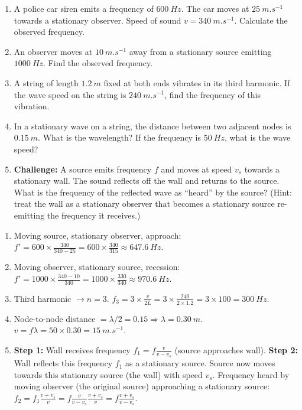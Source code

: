 \documentclass[11pt]{article}
\begin{document}
\begin{exercice}
\begin{enumerate}
\item A police car siren emits a frequency of $\SI{600}{Hz}$. The car moves at $\SI{25}{m.s^{-1}}$ towards a stationary observer. Speed of sound $v = \SI{340}{m.s^{-1}}$. Calculate the observed frequency.
\item An observer moves at $\SI{10}{m.s^{-1}}$ away from a stationary source emitting $\SI{1000}{Hz}$. Find the observed frequency.
\item A string of length $\SI{1.2}{m}$ fixed at both ends vibrates in its third harmonic. If the wave speed on the string is $\SI{240}{m.s^{-1}}$, find the frequency of this vibration.
\item In a stationary wave on a string, the distance between two adjacent nodes is $\SI{0.15}{m}$. What is the wavelength? If the frequency is $\SI{50}{Hz}$, what is the wave speed?
\item \textbf{Challenge:} A source emits frequency $f$ and moves at speed $v_s$ towards a stationary wall. The sound reflects off the wall and returns to the source. What is the frequency of the reflected wave as ``heard'' by the source? (Hint: treat the wall as a stationary observer that becomes a stationary source re-emitting the frequency it receives.)
\end{enumerate}
\end{exercice}

\begin{corrige}[Exercise n]
\begin{enumerate}
\item Moving source, stationary observer, approach: $f' = 600 \times \frac{340}{340-25} = 600 \times \frac{340}{315} \approx \SI{647.6}{Hz}$.
\item Moving observer, stationary source, recession: $f' = 1000 \times \frac{340-10}{340} = 1000 \times \frac{330}{340} \approx \SI{970.6}{Hz}$.
\item Third harmonic $\rightarrow n=3$. $f_3 = 3 \times \frac{v}{2L} = 3 \times \frac{240}{2 \times 1.2} = 3 \times 100 = \SI{300}{Hz}$.
\item Node-to-node distance $= \lambda/2 = 0.15 \Rightarrow \lambda = \SI{0.30}{m}$. $v = f\lambda = 50 \times 0.30 = \SI{15}{m.s^{-1}}$.
\item \textbf{Step 1:} Wall receives frequency $f_1 = f \frac{v}{v - v_s}$ (source approaches wall). \textbf{Step 2:} Wall reflects this frequency $f_1$ as a stationary source. Source now moves towards this stationary source (the wall) with speed $v_s$. Frequency heard by moving observer (the original source) approaching a stationary source: $f_2 = f_1 \frac{v + v_s}{v} = f \frac{v}{v - v_s} \frac{v + v_s}{v} = f \frac{v + v_s}{v - v_s}$.
\end{enumerate}
\end{corrige}
\end{document}
